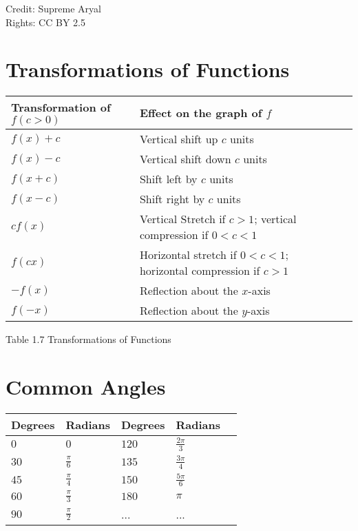 \documentclass[12pt]{book}
\begin{document}
Credit: Supreme Aryal \cite{unit} \\ 
Rights: CC BY 2.5

\newpage

\section{Transformations of Functions}

\begin{tabular}{*5l} \toprule
	Transformation of \(f(c>0)\) & Effect on the graph of \(f\) \\ \midrule
   \(f(x)+c\) & Vertical shift up \(c\) units \\
    \(f(x)-c\) & Vertical shift down \(c\) units \\
    \(f(x+c)\) & Shift left by \(c\) units \\
    \(f(x-c)\) & Shift right by \(c\) units \\
	\(cf(x)\) & Vertical Stretch if \(c>1\); vertical compression if \(0<c<1\) \\
	\(f(cx)\) & Horizontal stretch if \(0<c<1\); horizontal compression if \(c>1\) \\
	\(-f(x)\) & Reflection about the \(x\)-axis \\
	\(f(-x)\) & Reflection about the \(y\)-axis \\ \bottomrule
\end{tabular}

	Table 1.7 Transformations of Functions

	\section{Common Angles}

	\begin{tabular}{*5l} \toprule
		Degrees & Radians & Degrees & Radians \\ \midrule
	   \(0\) & \(0\) & \(120\) & \(\frac{2\pi}{3}\) \\
	\(30\) & \(\frac{\pi}{6}\) & \(135\) & \(\frac{3\pi}{4}\) \\
	\(45\) & \(\frac{\pi}{4}\) & \(150\) & \(\frac{5\pi}{6}\) \\
	\(60\) & \(\frac{\pi}{3}\) & \(180\) & \(\pi\) \\
	\(90\) & \(\frac{\pi}{2}\) & ... & ... \\ \bottomrule
	\end{tabular}
\end{document}
